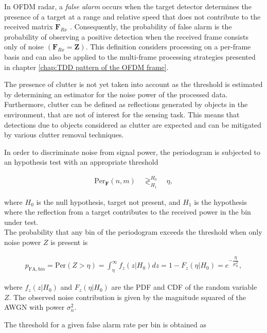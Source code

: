 	
	In OFDM radar, a \textit{false alarm} occurs when the target detector determines the presence of a target at a range and relative speed that does not contribute to the received matrix $\bm{F}_{Rx}$ \cite{Braun2014OFDMRA}. 
	Consequently, the probability of false alarm is the probability of observing a positive detection when the received frame consists only of noise $(\bm{F}_{Rx} = \bm{Z})$. 
	This definition considers processing on a per-frame basis and can also be applied to the multi-frame processing strategies presented in chapter \ref{chap:TDD pattern of the OFDM frame}. 
	
	The presence of clutter is not yet taken into account as the threshold is estimated by determining an estimator for the noise power of the processed data. 
	Furthermore, clutter can be defined as reflections generated by objects in the environment, that are not of interest for the sensing task. 
	This means that detections due to objects considered as clutter are expected and can be mitigated by various clutter removal techniques.
	
	In order to discriminate noise from signal power, the periodogram is subjected to an hypothesis test with an appropriate threshold
	
	\begin{align}
		\text{Per}_{\bm{F}}(n,m) \quad\mathop{\gtrless}_{H_1}^{H_0}  \quad \eta,
	\end{align}
	
	where $H_0$ is the null hypothesis, target not present, and $H_1$ is the hypothesis where the reflection from a target contributes to the received power in the bin under test.\\
	The probability that any bin of the periodogram exceeds the threshold when only noise power $Z$ is present is
	
	\begin{align}
		p_{\text{FA},bin} = \text{Per}(Z > \eta) = \int_\eta^{\infty} f_z(z|H_0)dz = 1 - F_z(\eta | H_0) = e^{-\dfrac{\eta}{\sigma_n^2}},
	\end{align}
	 
	where $f_z(z|H_0)$ and $F_z(\eta | H_0)$ are the PDF and CDF of the random variable $Z$. 
	The observed noise contribution is given by the magnitude squared of the AWGN with power $\sigma_n^2$.
	 
	The threshold for a given false alarm rate per bin is obtained as
	
